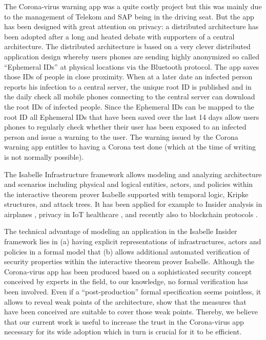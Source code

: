 \documentclass{llncs}
\begin{document}
The Corona-virus warning app
was a quite costly project but this was mainly due to the management of
Telekom and SAP being in the driving seat. But the app has been designed with great
attention on privacy:  a distributed architecture \cite{} has been adopted after a long and
heated debate with supporters of a central architecture. The distributed architecture is
based on a very clever distributed application design whereby users phones are sending
highly anonymized so called ``Ephemeral IDs'' at physical locations via the Bluetooth
protocol. The app saves those IDs of people in close proximity. When at a later date an
infected person reports his infection to a central server, the unique root ID is published
and in the daily check all mobile phones connecting to the central server can download
the root IDs of infected people. Since the Ephemeral IDs can be mapped to the root ID
all Ephemeral IDs that have been saved over the last 14 days allow users phones to
regularly check whether their user has been exposed to an infected person and issue
a warning to the user. The warning issued by the Corona warning app entitles to
having a Corona test done (which at the time of writing is not normally possible).

The Isabelle Infrastructure framework \cite{kam:20a} allows modeling and analyzing
architecture and scenarios including physical and logical entities, actors, and policies
within the interactive theorem prover Isabelle supported with temporal logic, Kripke
structures, and attack trees. It has been applied for example to Insider analysis in
airplanes \cite{kam:20b}, privacy in IoT healthcare \cite{kam:18b}, and recently also
to blockchain protocols \cite{kn:20}.

The technical advantage of modeling an application in the Isabelle Insider framework lies
in (a) having explicit representations of infrastructures, actors and policies in a
formal model that (b) allows additional automated verification of security properties
within the interactive theorem prover Isabelle.
Although the Corona-virus app has been produced based on a sophisticated security
concept conceived by experts in the field, to our knowledge, no formal verification
has been involved. Even if a ``post-production'' formal specification seems pointless,
it allows to reveal weak points of the architecture, show that the measures that have
been conceived are suitable to cover those weak points. Thereby, we believe
that our current work is useful to increase the trust in the Corona-virus app necessary for
its wide adoption which in turn is crucial for it to be efficient.
\end{document}
